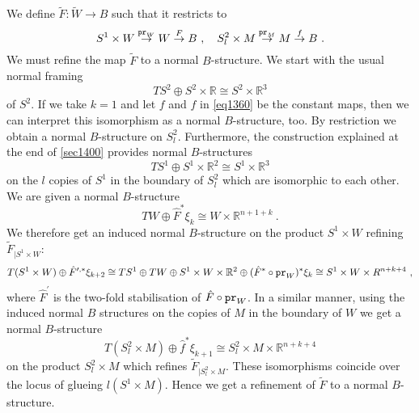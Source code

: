 \documentclass[12pt]{article}
\newcommand{\R}{{\mathbb{R}}}
\newcommand{\pr}{{\tt pr}}
\begin{document}
We define $\tilde F:\tilde W\to B$ such that it restricts to $$S^{1}\times W\stackrel{\pr_{W}}{\to} W\stackrel{F}{\to} B\ ,\quad 
S^{2}_{l}\times M\stackrel{\pr_{M}}{\to} M\stackrel{f}{\to} B\ .$$
We must refine the map $\tilde F$ to a normal $B$-structure.
We start with the usual  normal framing $$TS^{2}\oplus S^{2}\times \R\cong S^{2}\times \R^{3}$$ of $S^{2}$. If we take $k=1$ and let $f$ and  $\hat f$  in \eqref{eq1360} be the constant maps,
then we can interpret this isomorphism as a normal $B$-structure, too.
By restriction we obtain a normal $B$-structure on $S^{2}_{l}$. Furthermore, the construction explained at the end of \ref{sec1400}
provides   normal $B$-structures 
$$TS^{1}\oplus S^{1}\times \R^{2}\cong S^{1}\times \R^{3}$$
on the $l$ copies of $S^{1}$ in the boundary of  $S^{2}_{l}$ which are isomorphic to each other.
We are given a normal $B$-structure
$$TW\oplus \hat F^{*}\xi_{k}\cong W\times \R^{n+1+k}\ .$$
We therefore get an
induced normal $B$-structure  on the product $S^{1}\times W$ refining $\tilde F_{|S^{1}\times W}$:
$$T(S^{1}\times W)\oplus \hat F^{\prime,*}\xi_{k+2} \cong TS^{1}\oplus  TW\oplus S^{1}\times W\times \R^{2} \oplus (\hat F^{*}\circ \pr_{W})^{*}\xi_{k} \cong S^{1}\times W\times R^{n+k+4}\ ,$$
where $\hat F^{\prime}$ is the two-fold stabilisation of $\hat F\circ \pr_{W}$.
In a similar manner, using the induced normal $B$ structures on the copies of $M$ in the boundary of $W$ we get a normal $B$-structure 
$$T(S^{2}_{l}\times M)\oplus \hat f^{*}\xi_{k+1}\cong S^{2}_{l}\times M\times \R^{n+k+4}$$ on
the product $S^{2}_{l}\times M$ which refines $\tilde F_{|S^{2}_{l}\times M}$.
These isomorphisms coincide over  the locus of glueing $l(S^{1}\times M)$.
Hence we get a refinement of $\tilde F$ to a normal $B$-structure.



















 




\end{document}
